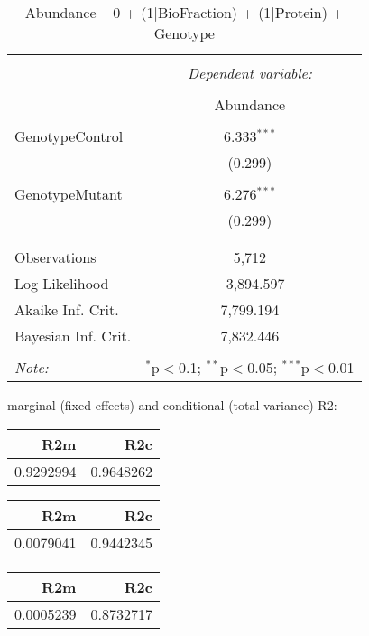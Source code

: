 \documentclass[11pt]{report}
\begin{document}
\begin{table}[!htbp] \centering 
  \caption{Abundance ~ 0 + (1|BioFraction) + (1|Protein) + Genotype} 
  \label{} 
\begin{tabular}{@{\extracolsep{5pt}}lc} 
\\[-1.8ex]\hline 
\hline \\[-1.8ex] 
 & \multicolumn{1}{c}{\textit{Dependent variable:}} \\ 
\cline{2-2} 
\\[-1.8ex] & Abundance \\ 
\hline \\[-1.8ex] 
 GenotypeControl & 6.333$^{***}$ \\ 
  & (0.299) \\ 
  & \\ 
 GenotypeMutant & 6.276$^{***}$ \\ 
  & (0.299) \\ 
  & \\ 
\hline \\[-1.8ex] 
Observations & 5,712 \\ 
Log Likelihood & $-$3,894.597 \\ 
Akaike Inf. Crit. & 7,799.194 \\ 
Bayesian Inf. Crit. & 7,832.446 \\ 
\hline 
\hline \\[-1.8ex] 
\textit{Note:}  & \multicolumn{1}{r}{$^{*}$p$<$0.1; $^{**}$p$<$0.05; $^{***}$p$<$0.01} \\ 
\end{tabular} 
\end{table} 
marginal (fixed effects) and conditional (total variance) R2:

\begin{tabular}{r|r}
\hline
R2m & R2c\\
\hline
0.9292994 & 0.9648262\\
\hline
\end{tabular}

\begin{tabular}{r|r}
\hline
R2m & R2c\\
\hline
0.0079041 & 0.9442345\\
\hline
\end{tabular}

\begin{tabular}{r|r}
\hline
R2m & R2c\\
\hline
0.0005239 & 0.8732717\\
\hline
\end{tabular}
\end{document}
